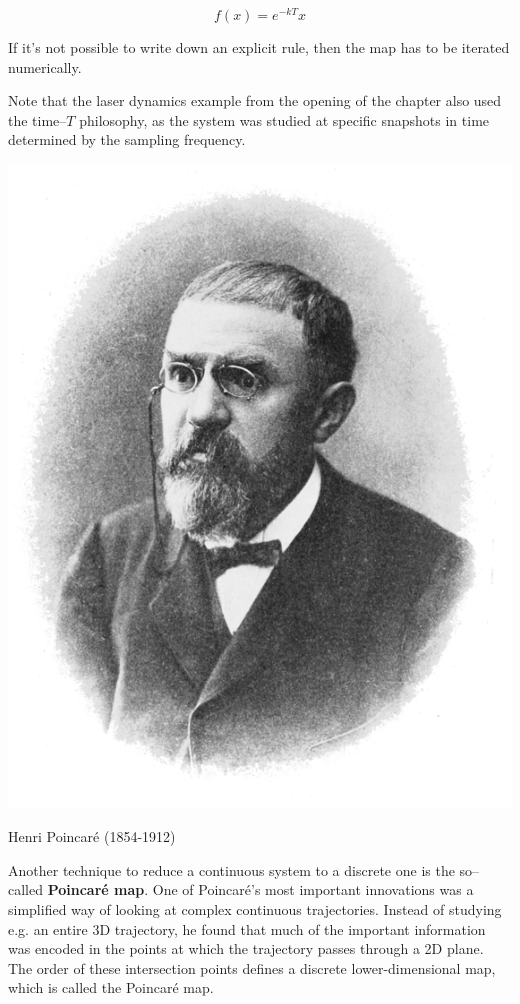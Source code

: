 \begin{equation}
f(x) = e^{-kT} x
\end{equation} 

If it's not possible to write down an explicit rule, then the map has to be iterated numerically.

Note that the laser dynamics example from the opening of the chapter also used the time--$T$ philosophy, as the system was studied at specific snapshots in time determined by the sampling frequency.

\begin{marginfigure}[-8.0cm]
  \includegraphics{dynamic/figures/poincare_photo}
  \caption{Henri Poincaré (1854-1912)}
\end{marginfigure}

Another technique to reduce a continuous system to a discrete one is the so--called \textbf{Poincar\'{e} map}. One of Poincar\'{e}'s most important innovations was a simplified way of looking at complex continuous trajectories. Instead of studying e.g. an entire 3D trajectory, he found that much of the important information was encoded in the points at which the trajectory passes through a 2D plane. The order of these intersection points defines a discrete lower-dimensional map, which is called the Poincar\'{e} map. 

